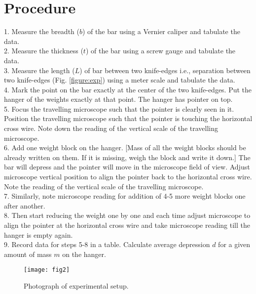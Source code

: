 \documentclass[12pt]{article}
\begin{document}
	\section{Procedure}
	
	1. Measure the breadth ($b$) of the bar using a Vernier 
	caliper and tabulate the data. \\[10pt]
	2. Measure the thickness ($t$) of the bar using a screw 
	gauge and tabulate the data.\\ [10pt]
	3. Measure the length ($L$) of bar between two knife-edges i.e., separation between two knife-edges (Fig. \ref{figure:exp}) using a meter scale 
	and tabulate the data. \\[10pt]
	4. Mark the point on the bar exactly at the center of the two knife-edges. Put the hanger of the weights exactly at that point. 
	The hanger has pointer on top. \\[10pt]
	5. Focus the travelling microscope such that the pointer is clearly seen in it. Position the travelling microscope such that the
	pointer is touching the horizontal cross wire. Note down the reading of the vertical scale of the travelling microscope.\\[10pt]
	6. Add one weight block on the hanger. [Mass of all the weight blocks should be already written on them. If it is missing, weigh 
	the block and write it down.] The bar will depress and the pointer will move in the microscope field of view. Adjust microscope vertical position to align the pointer back to the horizontal cross wire. Note the reading of the vertical scale of 
	the travelling microscope. \\[10pt]
	7. Similarly, note microscope reading for addition of 4-5 more weight blocks one after another. \\[10pt]
	8. Then start reducing the weight one by one and each time adjust microscope to align the pointer at the horizontal cross wire 
	and take microscope reading till the hanger is empty again.\\[10pt] 
	9. Record data for steps 5-8 in a table. Calculate average depression $d$ for a given amount of mass $m$ on the hanger.\\
	
	\begin{figure}[H]
		\centering
		\texttt{[image: fig2]}
		\caption{Photograph of experimental setup.}
		\label{figure:photo}
	\end{figure}

	\pagebreak
\end{document}
